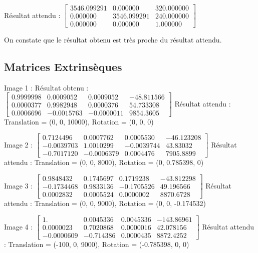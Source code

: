 \documentclass[a4paper]{article}
\begin{document}
Résultat attendu :
  $\begin{bmatrix}
    3546.099291 & 0.000000 & 320.000000 \\
    0.000000 & 3546.099291 & 240.000000 \\
    0.000000 & 0.000000 & 1.000000
  \end{bmatrix}$

On constate que le résultat obtenu est très proche du résultat attendu.

\subsection{Matrices Extrinsèques}

Image 1 :
Résultat obtenu :
$\begin{bmatrix}
  0.9999998 & 0.0009052 & 0.0009052 & - 48.811566 \\
  0.0000377 & 0.9982948 & 0.0000376 & 54.733308 \\
  0.0006696 & - 0.0015763 & - 0.0000011 & 9854.3605
\end{bmatrix}$
Résultat attendu :
Translation = (0, 0, 10000), Rotation = (0, 0, 0)

Image 2 :
$\begin{bmatrix}
  0.7124496 & 0.0007762 & 0.0005530 & - 46.123208 \\
  - 0.0039703 & 1.0010299 & - 0.0039744 & 43.83032 \\
  - 0.7017120 & - 0.0006379 & 0.0004476 & 7905.8899
\end{bmatrix}$
Résultat attendu :
Translation = (0, 0, 8000), Rotation = (0, 0.785398, 0)

Image 3 :
$\begin{bmatrix}
  0.9848432 & 0.1745697 & 0.1719238 & - 43.812298 \\
  - 0.1734468 & 0.9833136 & - 0.1705526 & 49.196566 \\
  0.0002832 & 0.0005524 & 0.0000002 & 8870.6728
\end{bmatrix}$
Résultat attendu :
Translation = (0, 0, 9000), Rotation = (0, 0, -0.174532)

Image 4 :
$\begin{bmatrix}
  1. & 0.0045336 & 0.0045336 & - 143.86961 \\
  0.0000023 & 0.7020868 & 0.0000016 & 42.078156 \\
  - 0.0000609 & - 0.714386 & 0.0000435 & 8872.4252
\end{bmatrix}$
Résultat attendu :
Translation = (-100, 0, 9000), Rotation = (-0.785398, 0, 0)
\end{document}
